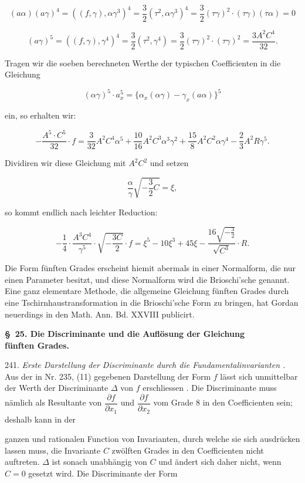 \documentclass[11pt]{article}
\providecommand{\weberpage}[1]{}
\let\Delta\varDelta
\begin{document}
\[ (a\alpha)(a\gamma)^4=((f,\gamma),\alpha\gamma^3)^4=\frac{3}{2}(\tau^2,\alpha\gamma^3)^4=\frac{3}{2}(\tau\gamma)^2\cdot(\tau\gamma)(\tau\alpha)=0 \]

\[ (a\gamma)^5=((f,\gamma),\gamma^4)^4=\frac{3}{2}(\tau^2,\gamma^4)=\frac{3}{2}(\tau\gamma)^2\cdot(\tau\gamma)^2=\frac{3A^2C^4}{32}. \]

Tragen wir die soeben berechneten Werthe der typischen Coefficienten
 in die Gleichung

\[ (\alpha\gamma)^5\cdot a_x^5=\{\alpha_x(\alpha\gamma)-\gamma_x(a\alpha)\}^5 \]

ein, so erhalten wir:

\[ -\frac{A^5\cdot C^5}{32}\cdot f = \frac{3}{32}A^2C^4\alpha^5+\frac{10}{16}A^2C^3\alpha^3\gamma^2+\frac{15}{8}A^2C^2\alpha\gamma^4-\frac{2}{3}A^2R\gamma^5. \]

Dividiren wir diese Gleichung mit $A^2C^2$ und setzen

\[ \frac{\alpha}{\gamma}\sqrt{-\frac{3}{2}C}=\xi, \]

so kommt endlich nach leichter Reduction:

\[ -\frac{1}{4}\cdot\frac{A^3C^4}{\gamma^5}\cdot\sqrt{-\frac{3C}{2}}\cdot f=\xi^5-10\xi^3+45\xi-\frac{16\sqrt{-\frac{3}{2}}}{\sqrt{C^3}}\cdot R. \]

Die Form fünften Grades erscheint hiemit abermals in einer
Normalform, die nur einen Parameter besitzt, und diese Normalform
wird die Brioschi'sche genannt. Eine ganz elementare Methode,
die allgemeine Gleichung fünften Grades durch eine Tschirnhaustransformation
 in die Brioschi'sche Form zu bringen, hat Gordan
neuerdings in den Math. Ann. Bd. XXVIII publicirt.

\begin{center}
\textbf{\S\ 25. Die Discriminante und die Auflösung der Gleichung}\\
\textbf{fünften Grades.}
\end{center}

241. \textit{Erste Darstellung der Discriminante durch die Fundamentalinvarianten
.} Aus der in Nr. 235, (11) gegebenen Darstellung der Form
$f$ lässt sich unmittelbar der Werth der Discriminante $\Delta$ von $f$ erschliessen
. Die Discriminante muss nämlich als Resultante von $\dfrac{\partial f}{\partial x_1}$
und $\dfrac{\partial f}{\partial x_2}$ vom Grade 8 in den Coefficienten sein; deshalb kann in der


\weberpage{267}
ganzen und rationalen Function von Invarianten, durch welche sie
sich ausdrücken lassen muss, die Invariante $C$ zwölften Grades in
den Coefficienten nicht auftreten. $\Delta$ ist sonach unabhängig von $C$
und ändert sich daher nicht, wenn $C=0$ gesetzt wird. Die Discriminante
der Form
\end{document}
